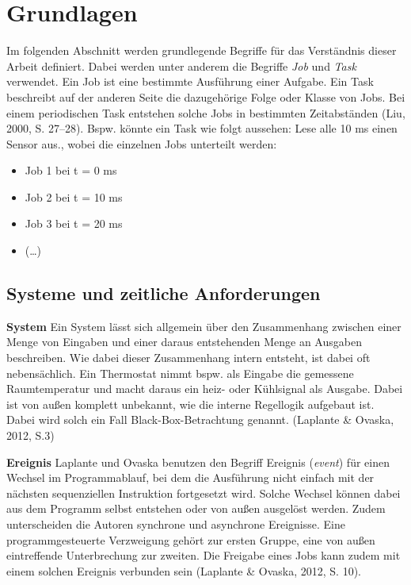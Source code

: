 \chapter{Grundlagen}

Im folgenden Abschnitt werden grundlegende Begriffe f{\"u}r das Verst{\"a}ndnis dieser Arbeit definiert. Dabei werden unter anderem die Begriffe \emph{Job} und \emph{Task} verwendet. Ein Job ist eine bestimmte Ausf{\"u}hrung einer Aufgabe. Ein Task beschreibt auf der anderen Seite die dazugeh{\"o}rige Folge oder Klasse von Jobs. Bei einem periodischen Task entstehen solche Jobs in bestimmten Zeitabst{\"a}nden (Liu, 2000, S. 27--28). Bspw. k{\"o}nnte ein Task wie folgt aussehen: \glqq{}Lese alle 10 ms einen Sensor aus.\grqq{}, wobei die einzelnen Jobs unterteilt werden:

\begin{itemize}
\item Job 1 bei t = 0 ms
\item Job 2 bei t = 10 ms
\item Job 3 bei t = 20 ms
\item (\ldots{})
\end{itemize}
\section{Systeme und zeitliche Anforderungen}
\textbf{System} Ein System l{\"a}sst sich allgemein {\"u}ber den Zusammenhang zwischen einer Menge von Eingaben und einer daraus entstehenden Menge an Ausgaben beschreiben. Wie dabei dieser Zusammenhang intern entsteht, ist dabei oft nebens{\"a}chlich. Ein Thermostat nimmt bspw. als Eingabe die gemessene Raumtemperatur und macht daraus ein heiz- oder K{\"u}hlsignal als Ausgabe. Dabei ist von au{\ss}en komplett unbekannt, wie die interne Regellogik aufgebaut ist. Dabei wird solch ein Fall Black-Box-Betrachtung genannt. (Laplante \& Ovaska, 2012, S.3)

\textbf{Ereignis }Laplante und Ovaska benutzen den Begriff Ereignis (\emph{event}) f{\"u}r einen Wechsel im Programmablauf, bei dem die Ausf{\"u}hrung nicht einfach mit der n{\"a}chsten sequenziellen Instruktion fortgesetzt wird. Solche Wechsel k{\"o}nnen dabei aus dem Programm selbst entstehen oder von au{\ss}en ausgel{\"o}st werden. Zudem unterscheiden die Autoren synchrone und asynchrone Ereignisse. Eine programmgesteuerte Verzweigung geh{\"o}rt zur ersten Gruppe, eine von au{\ss}en eintreffende Unterbrechung zur zweiten. Die Freigabe eines Jobs kann zudem mit einem solchen Ereignis verbunden sein (Laplante \& Ovaska, 2012, S. 10).

